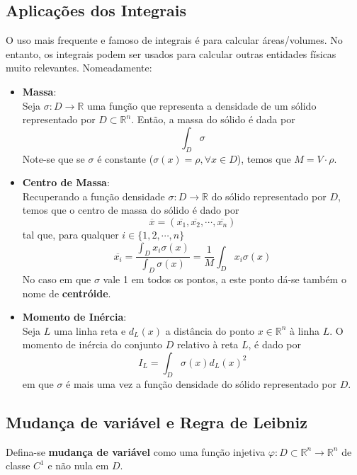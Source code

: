 \documentclass{article}
\newcommand{\R}{\mathbb{R}}
\begin{document}
\subsection{Aplicações dos Integrais}
O uso mais frequente e famoso de integrais é para calcular áreas/volumes. No entanto, os integrais podem ser usados para calcular outras entidades físicas muito relevantes. Nomeadamente:
\begin{itemize}
	\item \textbf{Massa}:\\
Seja $\sigma: D \to \R$ uma função que representa a densidade de um sólido representado por $D \subset \R^n$. Então, a massa do sólido é dada por
$$
\int_D \sigma
$$
Note-se que se $\sigma$ é constante ($\sigma(x) = \rho, \forall x \in D$), temos que $M = V \cdot \rho$.
	\item \textbf{Centro de Massa}:\\
Recuperando a função densidade $\sigma: D \to \R$ do sólido representado por $D$, temos que o centro de massa do sólido é dado por
$$
\overline{x} = (\overline{x_1}, \overline{x_2}, \cdots, \overline{x_n})
$$
tal que, para qualquer $i \in \{1, 2, \cdots, n \}$
$$
\overline{x_i} = \frac{\int_D x_i \sigma(x)}{\int_D \sigma(x)} = \frac{1}{M} \int_D x_i \sigma(x)
$$
No caso em que $\sigma$ vale 1 em todos os pontos, a este ponto dá-se também o nome de \textbf{centróide}.
	\item \textbf{Momento de Inércia}:\\
Seja $L$ uma linha reta e $d_L(x)$ a distância do ponto $x \in \R^n$ à linha $L$. O momento de inércia do conjunto $D$ relativo à reta $L$, é dado por
$$
I_L = \int_D \sigma(x) d_L(x)^2
$$
em que $\sigma$ é mais uma vez a função densidade do sólido representado por $D$.
\end{itemize}

\subsection{Mudança de variável e Regra de Leibniz}
Defina-se \textbf{mudança de variável} como uma função injetiva $\varphi: D \subset \R^n \to \R^n$ de classe $C^1$ e não nula em $D$. 
\end{document}
